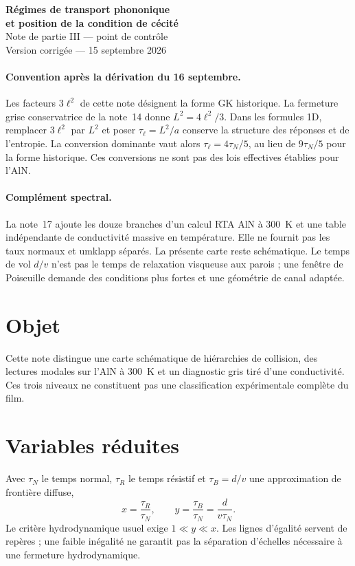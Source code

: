 \documentclass[11pt,a4paper]{article}
\begin{document}
\begin{center}
{\Large\bfseries Régimes de transport phononique\\et position de la condition de cécité}\\[5pt]
{\normalsize Note de partie III --- point de contrôle}\\[2pt]
{\small Version corrigée --- 15 septembre 2026}
\end{center}

\vspace{4pt}

\paragraph{Convention après la dérivation du 16 septembre.}
Les facteurs $3\ell^2$ de cette note désignent la forme GK historique.
La fermeture grise conservatrice de la note~14 donne $L^2=4\ell^2/3$.
Dans les formules 1D, remplacer $3\ell^2$ par $L^2$ et poser
$\tau_\ell=L^2/a$ conserve la structure des réponses et de l'entropie.
La conversion dominante vaut alors $\tau_\ell=4\tau_N/5$, au lieu de
$9\tau_N/5$ pour la forme historique. Ces conversions ne sont pas des
lois effectives établies pour l'AlN.

\paragraph{Complément spectral.}
La note~17 ajoute les douze branches d'un calcul RTA AlN à 300~K et
une table indépendante de conductivité massive en température.
Elle ne fournit pas les taux normaux et umklapp séparés.
La présente carte reste schématique. Le temps de vol $d/v$ n'est pas
le temps de relaxation visqueuse aux parois ; une fenêtre de Poiseuille
demande des conditions plus fortes et une géométrie de canal adaptée.

\section{Objet}
Cette note distingue une carte schématique de hiérarchies de collision, des lectures
modales sur l'AlN à 300~K et un diagnostic gris tiré d'une conductivité.
Ces trois niveaux ne constituent pas une classification expérimentale complète du film.

\section{Variables réduites}
Avec $\tau_N$ le temps normal, $\tau_R$ le temps résistif et
$\tau_B=d/v$ une approximation de frontière diffuse,
\[
x=\frac{\tau_R}{\tau_N},\qquad y=\frac{\tau_B}{\tau_N}
=\frac{d}{v\tau_N}.
\]
Le critère hydrodynamique usuel exige $1\ll y\ll x$.
Les lignes d'égalité servent de repères ; une faible inégalité ne garantit pas
la séparation d'échelles nécessaire à une fermeture hydrodynamique.
\end{document}
